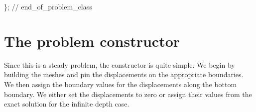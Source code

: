 \begin{DoxyCodeInclude}
\}; \textcolor{comment}{// end\_of\_problem\_class}

\end{DoxyCodeInclude}




 

\hypertarget{index_constructor}{}\section{The problem constructor}\label{index_constructor}
Since this is a steady problem, the constructor is quite simple. We begin by building the meshes and pin the displacements on the appropriate boundaries. We then assign the boundary values for the displacements along the bottom boundary. We either set the displacements to zero or assign their values from the exact solution for the infinite depth case.


